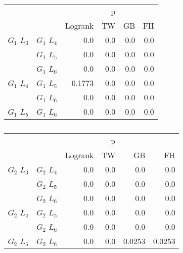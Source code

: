       
      \begin{table}
        \centering
        \begin{tabular}{llrrrr}
          \toprule
                       &             &         &  p &    &     \\
          \cmidrule{3-6}
                       &             & Logrank & TW & GB & FH  \\
          \midrule
          $G_1$ $L_3$  & $G_1$ $L_4$  &  0.0 &  0.0 &  0.0 &  0.0     \\
                       & $G_1$ $L_5$  & 0.0 & 0.0 & 0.0 & 0.0    \\
                       & $G_1$ $L_6$  & 0.0 & 0.0 & 0.0 & 0.0      \\
          $G_1$ $L_4$  & $G_1$ $L_5$  & 0.1773 & 0.0 & 0.0 & 0.0      \\
                       & $G_1$ $L_6$  & 0.0 & 0.0 & 0.0 & 0.0       \\
          $G_1$ $L_5$   & $G_1$ $L_6$ & 0.0 &  0.0 & 0.0 & 0.0      \\
          \bottomrule
        \end{tabular}
        \label{tab:g1_ingroup_tests_radius}
        \caption{}
      \end{table}


      \begin{table}
        \centering
        \begin{tabular}{llrrrr}
          \toprule
                       &             &         &  p &    &     \\
          \cmidrule{3-6}
                       &             & Logrank & TW & GB & FH  \\
          \midrule
          $G_2$ $L_3$  & $G_2$ $L_4$  &  0.0 &  0.0 &  0.0 &  0.0     \\
                       & $G_2$ $L_5$  & 0.0 & 0.0 & 0.0 & 0.0    \\
                       & $G_2$ $L_6$  & 0.0 & 0.0 & 0.0 & 0.0      \\
          $G_2$ $L_4$  & $G_2$ $L_5$  & 0.0 & 0.0 & 0.0 & 0.0      \\
                       & $G_2$ $L_6$  & 0.0 & 0.0 & 0.0 & 0.0       \\
          $G_2$ $L_5$   & $G_2$ $L_6$ & 0.0 & 0.0 & 0.0253 & 0.0253      \\
          \bottomrule
        \end{tabular}
        \label{tab:g2_ingroup_tests_radius}
        \caption{}
      \end{table}


